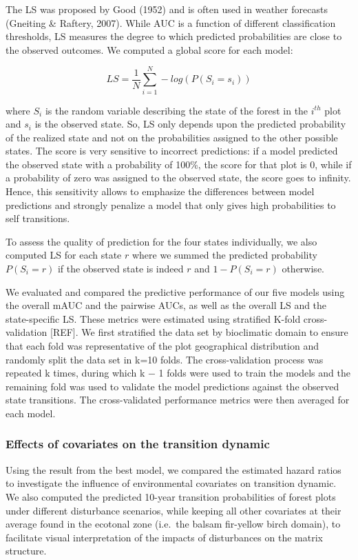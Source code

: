 \documentclass[a4paperpaper,]{article}
\begin{document}
The LS was proposed by Good (1952) and is often used in weather
forecasts (Gneiting \& Raftery, 2007). While AUC is a function of
different classification thresholds, LS measures the degree to which
predicted probabilities are close to the observed outcomes. We computed
a global score for each model:

\[LS = \frac{1}{N} \sum_{i=1}^N -log(P(S_i = s_i))\]

where \(S_i\) is the random variable describing the state of the forest
in the \(i^{th}\) plot and \(s_i\) is the observed state. So, LS only
depends upon the predicted probability of the realized state and not on
the probabilities assigned to the other possible states. The score is
very sensitive to incorrect predictions: if a model predicted the
observed state with a probability of 100\%, the score for that plot is
0, while if a probability of zero was assigned to the observed state,
the score goes to infinity. Hence, this sensitivity allows to emphasize
the differences between model predictions and strongly penalize a model
that only gives high probabilities to self transitions.

To assess the quality of prediction for the four states individually, we
also computed LS for each state \(r\) where we summed the predicted
probability \(P(S_i = r)\) if the observed state is indeed \(r\) and
\(1 - P(S_i = r)\) otherwise.

We evaluated and compared the predictive performance of our five models
using the overall mAUC and the pairwise AUCs, as well as the overall LS
and the state-specific LS. These metrics were estimated using stratified
K-fold cross-validation {[}REF{]}. We first stratified the data set by
bioclimatic domain to ensure that each fold was representative of the
plot geographical distribution and randomly split the data set in k=10
folds. The cross-validation process was repeated k times, during which k
− 1 folds were used to train the models and the remaining fold was used
to validate the model predictions against the observed state
transitions. The cross-validated performance metrics were then averaged
for each model.

\hypertarget{effects-of-covariates-on-the-transition-dynamic}{%
\subsubsection{Effects of covariates on the transition
dynamic}\label{effects-of-covariates-on-the-transition-dynamic}}

Using the result from the best model, we compared the estimated hazard
ratios to investigate the influence of environmental covariates on
transition dynamic. We also computed the predicted 10-year transition
probabilities of forest plots under different disturbance scenarios,
while keeping all other covariates at their average found in the
ecotonal zone (i.e.~the balsam fir-yellow birch domain), to facilitate
visual interpretation of the impacts of disturbances on the matrix
structure.
\end{document}
